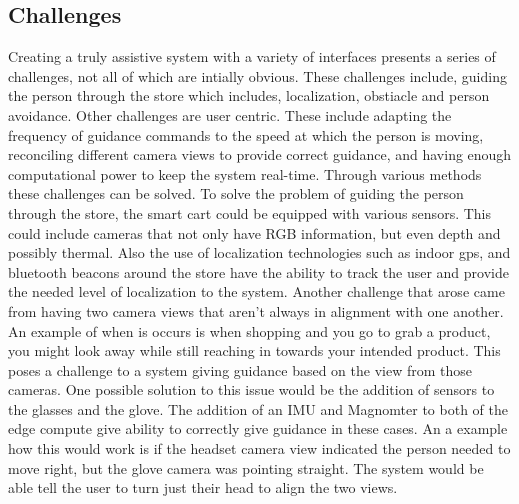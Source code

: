 \subsection{Challenges}
Creating a truly assistive system with a variety of interfaces presents a series 
of challenges, not all of which are intially obvious. These challenges include, guiding the person
through the store which includes, localization, obstiacle and person avoidance. Other challenges are
user centric. These include adapting the frequency of guidance commands to the speed at which the person is moving, 
reconciling different camera views to provide correct guidance, and having enough computational power to keep the system real-time. 
Through various methods these challenges can be solved. To solve the problem of guiding the person through the store, the smart cart could be equipped with various sensors. This could include cameras that not only have RGB information, but even depth and possibly thermal. Also the use of
localization technologies such as indoor gps, and bluetooth beacons around the store have the ability to track the user and provide the needed level of localization to the system.
Another challenge that arose came from having two camera views that aren't always in alignment with one another. An example of when is occurs is when shopping and you go to grab a product, you might look away while still reaching in towards your intended product. This poses a challenge to a system giving guidance based on the view from those cameras. One possible solution to this issue would be the addition of sensors to the glasses and the glove. The addition of an IMU and Magnomter to both of the edge compute give ability to correctly give guidance in these cases. An a example how this would work is if the headset camera view indicated the person needed to move right, but the glove camera was pointing straight. The system would be able tell the user to turn just their head to align the two views.
